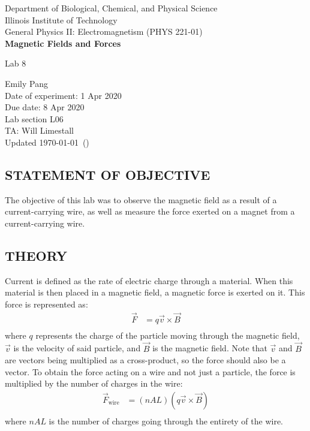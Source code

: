 \documentclass [12pt, letterpaper, twoside] {article}
\begin{document}
\begin {titlepage}
\begin {center}
Department of Biological, Chemical, and Physical Science\\
\vspace {0.1cm}
Illinois Institute of Technology\\
\vspace {0.1cm}
General Physics II: Electromagnetism (PHYS 221-01)\\
\vspace* {\fill}
\begingroup
\Large
\textbf {Magnetic Fields and Forces}
\vspace {0.35cm}

\normalsize
Lab 8
\vspace {1.5cm}
\endgroup
\vspace* {\fill}
\end {center}

\vspace*{\fill}
\begin {flushright}
\footnotesize
Emily Pang \\
Date of experiment: 1 Apr 2020 \\
Due date: 8 Apr 2020 \\
Lab section L06 \\
TA: Will Limestall \\
Updated \usdate\today~(\currenttime)
\end {flushright}
\end {titlepage}
\subsection* {STATEMENT OF OBJECTIVE}
The objective of this lab was to observe the magnetic field as a result of a current-carrying wire, as well as measure the force exerted on a magnet from a current-carrying wire.

\subsection* {THEORY}
Current is defined as the rate of electric charge through a material. When this material is then placed in a magnetic field, a magnetic force is exerted on it. This force is represented as:
\begin{equation*}
  \begin{split}
    \vec{F} &= q\vec{v}\times{\vec{B}} \\
  \end{split}
\end{equation*}
where \(q\) represents the charge of the particle moving through the magnetic field, \(\vec{v}\) is the velocity of said particle, and \(\vec{B}\) is the magnetic field. Note that \(\vec{v}\) and \(\vec{B}\) are vectors being multiplied as a cross-product, so the force should also be a vector. To obtain the force acting on a wire and not just a particle, the force is multiplied by the number of charges in the wire:
\begin{equation*}
  \begin{split}
    \vec{F}_{\text{wire}} &= (nAL)(q\vec{v}\times{\vec{B}}) \\
  \end{split}
\end{equation*}
where \(nAL\) is the number of charges going through the entirety of the wire.
\end{document}
